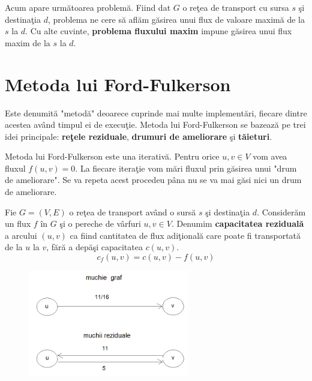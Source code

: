 \documentclass[11pt,a4paper]{report}
\begin{document}
	Acum apare urm\u atoarea problem\u a. Fiind dat $G$ o re\c tea de transport cu sursa $s$ \c si destina\c tia $d$, problema ne cere s\u a afl\u am  g\u asirea unui flux de valoare maxim\u a de la $s$ la $d$. Cu alte cuvinte, \textbf{problema fluxului maxim} impune g\u asirea unui flux maxim de la $s$ la $d$.
 
 	\section{Metoda lui Ford-Fulkerson}
 	
 	
   	Este denumit\u a "metod\u a" deoarece cuprinde mai multe implement\u ari, fiecare dintre acestea av\^ and timpul ei de execu\c tie. Metoda lui Ford-Fulkerson se bazeaz\u a pe trei idei principale: \textbf{re\c tele reziduale}, \textbf{drumuri de ameliorare} \c si\textbf{ t\u aieturi}.
   	
   	Metoda lui Ford-Fulkerson este una iterativ\u a. Pentru orice $u,v\in V$ vom avea fluxul $f(u,v)=0$. La fiecare itera\c tie vom m\u ari  fluxul prin g\u asirea unui "drum de ameliorare". Se va repeta acest procedeu p\^ ana nu se va mai g\u asi nici un drum de ameliorare.

   	
   	
   	  Fie $G=(V,E)$ o re\c tea de transport av\^ and o surs\u a $s$ \c si destina\c tia $d$. Consider\u am un flux $f$ \^ in $G$ \c si o pereche de v\^ arfuri $u,v\in V$. Denumim \textbf{capacitatea rezidual\u a} a arcului $(u,v)$ ca fiind cantitatea de flux adi\c tional\u a care poate fi transportat\u a de la $u$ la $v$, f\u ar\u a a dep\u a\c si capacitatea $c(u,v)$.
   	   		\begin{equation*}
   	  c_{f}(u,v)=c(u,v)-f(u,v)
   	  \end{equation*}
   	  
   	   \begin{figure}[!hbt]
   	  	\centering
   	  	\includegraphics[width=7cm]{MuchiiReziduale.png}
   	  \end{figure}
   	  
\end{document}
